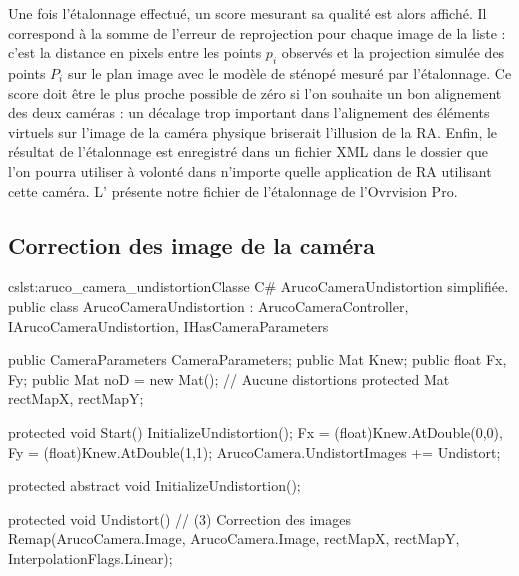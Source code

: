 Une fois l'étalonnage effectué, un score mesurant sa qualité est alors affiché. Il correspond à la somme de l'erreur de reprojection pour chaque image de la liste : c'est la distance en pixels entre les points $p_i$ observés et la projection simulée des points $P_i$ sur le plan image avec le modèle de sténopé mesuré par l'étalonnage. Ce score doit être le plus proche possible de zéro si l'on souhaite un bon alignement des deux caméras : un décalage trop important dans l'alignement des éléments virtuels sur l'image de la caméra physique briserait l'illusion de la RA. Enfin, le résultat de l'étalonnage est enregistré dans un fichier XML dans le dossier  que l'on pourra utiliser à volonté dans n'importe quelle application de RA utilisant cette caméra. L' présente notre fichier de l'étalonnage de l'Ovrvision Pro.

\subsection{Correction des image de la caméra}
\label{subsec:pinhole_camera_undistortion}


\begin{listingETS}{cs}{lst:aruco_camera_undistortion}{Classe C\# ArucoCameraUndistortion simplifiée.}
  public class ArucoCameraUndistortion : ArucoCameraController, IArucoCameraUndistortion, IHasCameraParameters
  {
    public CameraParameters CameraParameters;
    public Mat Knew;
    public float Fx, Fy;
    public Mat noD = new Mat(); // Aucune distortions
    protected Mat rectMapX, rectMapY;

    protected void Start()
    {
      InitializeUndistortion();
      Fx = (float)Knew.AtDouble(0,0), Fy = (float)Knew.AtDouble(1,1);
      ArucoCamera.UndistortImages += Undistort;
    }

    protected abstract void InitializeUndistortion();

    protected void Undistort() // (3) Correction des images
    {
      Remap(ArucoCamera.Image, ArucoCamera.Image, rectMapX, rectMapY, InterpolationFlags.Linear);
    }
  }
\end{listingETS}

